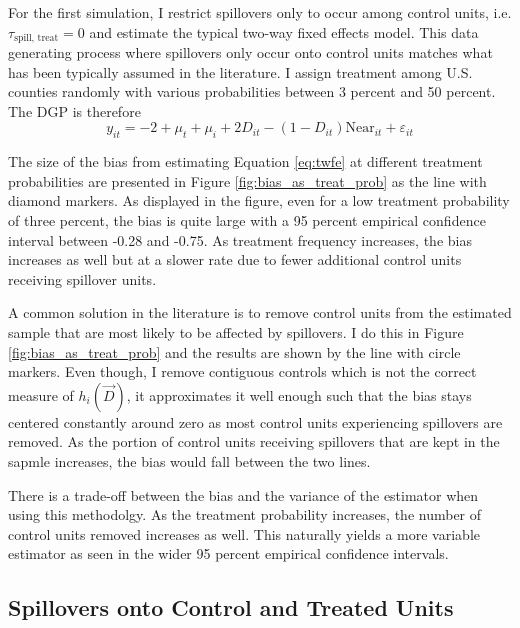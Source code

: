 \documentclass[11pt]{article}
\begin{document}
For the first simulation, I restrict spillovers only to occur among control units, i.e. $\tau_{\text{spill, treat}} = 0$ and estimate the typical two-way fixed effects model. This data generating process where spillovers only occur onto control units matches what has been typically assumed in the literature. I assign treatment among U.S. counties randomly with various probabilities between 3 percent and 50 percent. The DGP is therefore 
\begin{equation}
    \label{dgp1} 
    y_{it} = -2 + \mu_t + \mu_i + 2 D_{it} - (1-D_{it}) \text{Near}_{it} + \varepsilon_{it}   
\end{equation}

The size of the bias from estimating Equation \ref{eq:twfe} at different treatment probabilities are presented in Figure \ref{fig:bias_as_treat_prob} as the line with diamond markers. As displayed in the figure, even for a low treatment probability of three percent, the bias is quite large with a 95 percent empirical confidence interval between -0.28 and -0.75. As treatment frequency increases, the bias increases as well but at a slower rate due to fewer additional control units receiving spillover units. 

A common solution in the literature is to remove control units from the estimated sample that are most likely to be affected by spillovers. I do this in Figure \ref{fig:bias_as_treat_prob} and the results are shown by the line with circle markers. Even though, I remove contiguous controls which is not the correct measure of $h_i(\vec{D})$, it approximates it well enough such that the bias stays centered constantly around zero as most control units experiencing spillovers are removed. As the portion of control units receiving spillovers that are kept in the sapmle increases, the bias would fall between the two lines.

There is a trade-off between the bias and the variance of the estimator when using this methodolgy. As the treatment probability increases, the number of control units removed increases as well. This naturally yields a more variable estimator as seen in the wider 95 percent empirical confidence intervals. 


\subsection{Spillovers onto Control and Treated Units}
\end{document}
